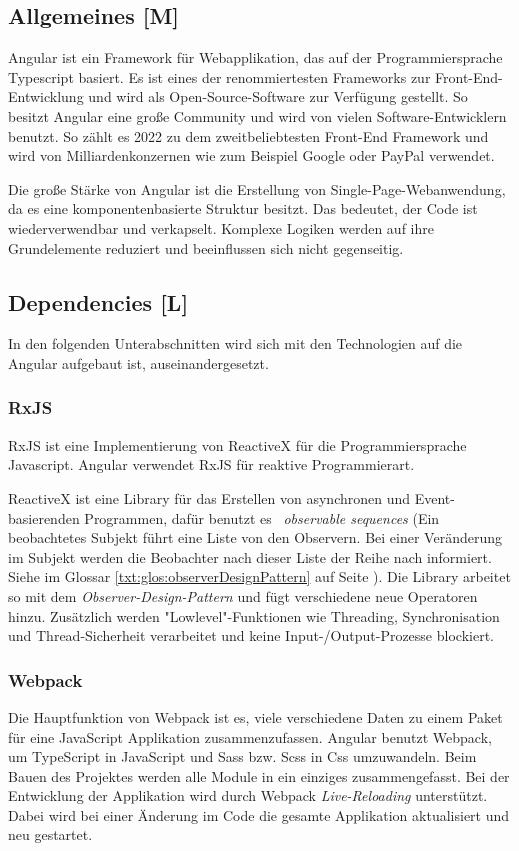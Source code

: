 \subsection{Allgemeines [M]}
Angular ist ein Framework für Webapplikation, das auf der Programmiersprache Typescript basiert. Es ist eines der renommiertesten Frameworks zur Front-End-Entwicklung und wird als Open-Source-Software zur Verfügung gestellt. So besitzt Angular eine große Community und wird von vielen Software-Entwicklern benutzt. So zählt es 2022 zu dem zweitbeliebtesten Front-End Framework \cite{AngularEvidence} und wird von Milliardenkonzernen wie zum Beispiel Google oder PayPal verwendet. 
\cite{AngularEvidence2}

Die große Stärke von Angular ist die Erstellung von Single-Page-Webanwendung, da es eine komponentenbasierte Struktur besitzt. Das bedeutet, der Code ist wiederverwendbar und verkapselt. Komplexe Logiken werden auf ihre Grundelemente reduziert und beeinflussen sich nicht gegenseitig.
\cite{AngularGeneral}

\subsection{Dependencies [L]}
In den folgenden Unterabschnitten wird sich mit den Technologien auf die Angular aufgebaut ist, auseinandergesetzt. 
\subsubsection{RxJS}
RxJS ist eine Implementierung von ReactiveX für die Programmiersprache Javascript. Angular verwendet RxJS für reaktive Programmierart.

ReactiveX ist eine Library für das Erstellen von asynchronen und Event-basierenden Programmen, dafür benutzt es  \emph{observable sequences} (Ein beobachtetes Subjekt führt eine Liste von den Observern. Bei einer Veränderung im Subjekt werden die Beobachter nach dieser Liste der Reihe nach informiert. Siehe im Glossar \ref{txt:glos:observerDesignPattern} auf Seite \pageref{txt:glos:observerDesignPattern}).
Die Library arbeitet so mit dem \emph{Observer-Design-Pattern} und fügt verschiedene neue Operatoren hinzu. Zusätzlich werden "Lowlevel"-Funktionen wie Threading, Synchronisation und Thread-Sicherheit verarbeitet und keine Input-/Output-Prozesse blockiert.

\cite{ReactiveXIntro}
\subsubsection{Webpack}
Die Hauptfunktion von Webpack ist es, viele verschiedene Daten zu einem Paket für eine JavaScript Applikation zusammenzufassen.
Angular benutzt Webpack, um TypeScript in JavaScript und Sass bzw. Scss in Css umzuwandeln. Beim Bauen des Projektes werden alle Module in ein einziges zusammengefasst. Bei der Entwicklung der Applikation wird durch Webpack \emph{Live-Reloading} unterstützt. Dabei wird bei einer Änderung im Code die gesamte Applikation aktualisiert und neu gestartet.


